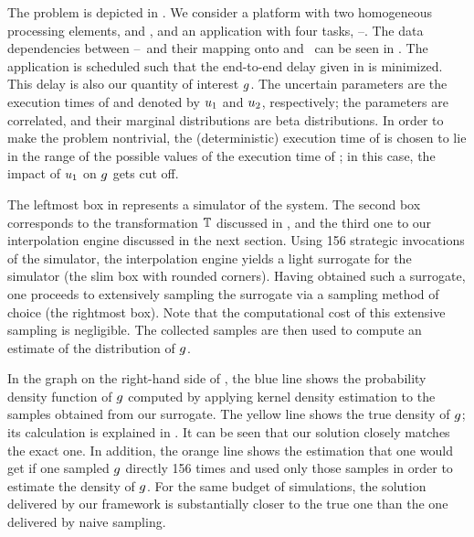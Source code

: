 \newcommand{\cores}{\token{PE1} and \token{PE2}}
\newcommand{\tasks}{\token{T1}--\token{T4}}
The problem is depicted in . We consider a platform with two
homogeneous processing elements, \cores, and an application with four tasks,
\tasks. The data dependencies between \tasks\ and their mapping onto \cores\ can
be seen in . The application is scheduled such that the end-to-end
delay given in  is minimized. This delay is also our
quantity of interest $g$. The uncertain parameters are the execution times of
 and  denoted by $u_1$ and $u_2$, respectively; the
parameters are correlated, and their marginal distributions are beta
distributions. In order to make the problem nontrivial, the (deterministic)
execution time of  is chosen to lie in the range of the possible
values of the execution time of ; in this case, the impact of $u_1$
on $g$ gets cut off.

The leftmost box in  represents a simulator of the system. The
second box corresponds to the transformation $\mathbb{T}$ discussed in
, and the third one to our interpolation engine discussed in
the next section. Using 156 strategic invocations of the simulator, the
interpolation engine yields a light surrogate for the simulator (the slim box
with rounded corners). Having obtained such a surrogate, one proceeds to
extensively sampling the surrogate via a sampling method of choice (the
rightmost box). Note that the computational cost of this extensive sampling is
negligible. The collected samples are then used to compute an estimate of the
distribution of $g$.

In the graph on the right-hand side of , the blue line shows the
probability density function of $g$ computed by applying kernel density
estimation to the samples obtained from our surrogate. The yellow line shows the
true density of $g$; its calculation is explained in . It
can be seen that our solution closely matches the exact one. In addition, the
orange line shows the estimation that one would get if one sampled $g$ directly
156 times and used only those samples in order to estimate the density of $g$.
For the same budget of simulations, the solution delivered by our framework is
substantially closer to the true one than the one delivered by naive sampling.
